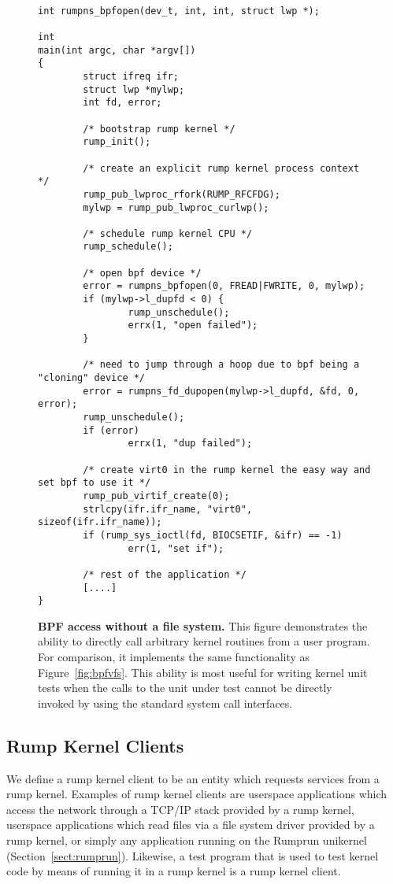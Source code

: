 \begin{figure}[]
{\tt \scriptsize
\begin{verbatim}
int rumpns_bpfopen(dev_t, int, int, struct lwp *);

int
main(int argc, char *argv[])
{
        struct ifreq ifr;
        struct lwp *mylwp;
        int fd, error;

        /* bootstrap rump kernel */
        rump_init();

        /* create an explicit rump kernel process context */
        rump_pub_lwproc_rfork(RUMP_RFCFDG);
        mylwp = rump_pub_lwproc_curlwp();

        /* schedule rump kernel CPU */
        rump_schedule();

        /* open bpf device */
        error = rumpns_bpfopen(0, FREAD|FWRITE, 0, mylwp);
        if (mylwp->l_dupfd < 0) {
                rump_unschedule();
                errx(1, "open failed");
        }

        /* need to jump through a hoop due to bpf being a "cloning" device */
        error = rumpns_fd_dupopen(mylwp->l_dupfd, &fd, 0, error);
        rump_unschedule();
        if (error)
                errx(1, "dup failed");

        /* create virt0 in the rump kernel the easy way and set bpf to use it */
        rump_pub_virtif_create(0);
        strlcpy(ifr.ifr_name, "virt0", sizeof(ifr.ifr_name));
        if (rump_sys_ioctl(fd, BIOCSETIF, &ifr) == -1)
                err(1, "set if");

        /* rest of the application */
        [....]
}
\end{verbatim}}
\caption[BPF access without a file system]{\textbf{BPF access without
a file system.}  This figure demonstrates the ability to directly
call arbitrary kernel routines from a user program.  For comparison,
it implements the same functionality as Figure~\ref{fig:bpfvfs}.
This ability is most useful for writing kernel unit tests when the calls
to the unit under test cannot be directly invoked by using the standard
system call interfaces.}
\label{fig:bpfdirect}
\end{figure}

\subsection{Rump Kernel Clients}
\label{sect:clitax}

We define a rump kernel client to be an entity which requests
services from a rump kernel.  Examples of rump kernel clients are
userspace applications which access the network through a TCP/IP stack
provided by a rump kernel, userspace applications which read files via
a file system driver provided by a rump kernel, or simply any application
running on the Rumprun unikernel (Section~\ref{sect:rumprun}).  Likewise,
a test program that is used to test kernel code by means of running it
in a rump kernel is a rump kernel client.

